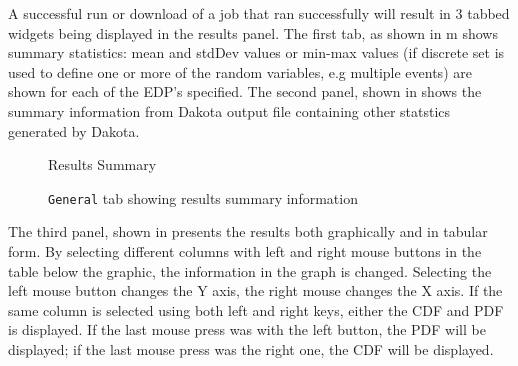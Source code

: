 A successful run or
download of a job that ran successfully will result in 3 tabbed
widgets being displayed in the results panel.  The first tab, as shown in
m shows summary statistics: mean and
stdDev values or min-max values (if discrete set is used to define one or more of the random variables, e.g multiple events)
are shown for each of the EDP's specified. The second panel,
shown in  shows the summary
information from Dakota output file containing other statstics generated by Dakota.

\begin{figure}[!htbp]
  \caption{Results Summary}
  \label{fig:results_summary}
\end{figure}

\begin{figure}[!htbp]
  \caption{\texttt{General} tab showing results summary information}
  \label{fig:summary_information}
\end{figure}

The third panel, shown in  presents the results both
graphically and in tabular form. By selecting different
columns with left and right mouse buttons in the table below the
graphic, the information in the graph is changed. Selecting the left
mouse button changes the Y axis, the right mouse changes the X
axis. If the same column is selected using both left and right keys,
either the CDF and PDF is displayed. If the last mouse press was with the left
button, the PDF will be displayed; if the last mouse press was the right one, the CDF
will be displayed.
 
